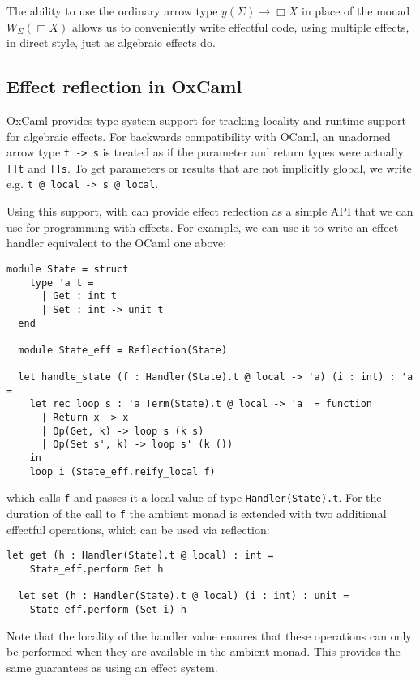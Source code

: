 \documentclass[acmsmall, screen, nonacm]{acmart}
\theoremstyle{definition}
\newcommand{\glob}{\mathop{\Box}}
\newcommand{\yoneda}[1]{y(#1)}
\newcommand{\ind}[1]{W_{#1}}
\begin{document}
The ability to use the ordinary arrow type
$\yoneda{\Sigma} \mathbin{\rightarrow} \glob X$ in place of the monad
$\ind{\Sigma}(\glob X)$ allows us to conveniently write effectful code,
using multiple effects, in direct style, just as algebraic effects do.

\subsection{Effect reflection in OxCaml}
OxCaml\cite{lorenzen2024oxidizing} provides type system support for
tracking locality and runtime support for algebraic effects. For
backwards compatibility with OCaml, an unadorned arrow type
\lstinline[style=oxcaml]{t -> s} is treated as if the parameter and
return types were actually \lstinline[style=oxcaml]{[]t} and
\lstinline[style=oxcaml]{[]s}. To get parameters or results that are not
implicitly global, we write
e.g. \lstinline[style=oxcaml]{t @ local -> s @ local}.

Using this support, with can provide effect reflection as a simple API
that we can use for programming with effects.  For example, we can use
it to write an effect handler equivalent to the OCaml one above:
\begin{lstlisting}[style=oxcaml]
  module State = struct
    type 'a t =
      | Get : int t
      | Set : int -> unit t
  end

  module State_eff = Reflection(State)

  let handle_state (f : Handler(State).t @ local -> 'a) (i : int) : 'a =
    let rec loop s : 'a Term(State).t @ local -> 'a  = function
      | Return x -> x
      | Op(Get, k) -> loop s (k s)
      | Op(Set s', k) -> loop s' (k ())
    in
    loop i (State_eff.reify_local f)
\end{lstlisting}
which calls \lstinline[style=oxcaml]{f} and passes it a local value of
type \lstinline[style=oxcaml]{Handler(State).t}. For the duration of the
call to \lstinline[style=oxcaml]{f} the ambient monad is extended with
two additional effectful operations, which can be used via reflection:
\begin{lstlisting}[style=oxcaml]
  let get (h : Handler(State).t @ local) : int =
    State_eff.perform Get h

  let set (h : Handler(State).t @ local) (i : int) : unit =
    State_eff.perform (Set i) h
\end{lstlisting}

Note that the locality of the handler value ensures that these
operations can only be performed when they are available in the ambient
monad. This provides the same guarantees as using an effect system.
\end{document}
